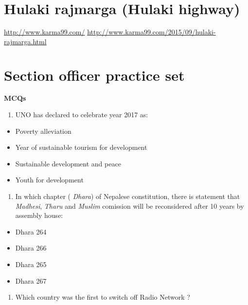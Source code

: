 \documentclass[]{book}
\providecommand{\tightlist}{%
  \setlength{\itemsep}{0pt}\setlength{\parskip}{0pt}}
\begin{document}
\hypertarget{hulaki-rajmarga-hulaki-highway}{%
\section{Hulaki rajmarga (Hulaki highway)}\label{hulaki-rajmarga-hulaki-highway}}

\url{http://www.karma99.com/}
\url{http://www.karma99.com/2015/09/hulaki-rajmarga.html}

\hypertarget{section-officer-practice-set}{%
\section{Section officer practice set}\label{section-officer-practice-set}}

\textbf{MCQs}

\begin{enumerate}
\def\labelenumi{\arabic{enumi}.}
\tightlist
\item
  UNO has declared to celebrate year 2017 as:
\end{enumerate}

\begin{itemize}
\tightlist
\item
  Poverty alleviation
\item
  Year of sustainable tourism for development
\item
  Sustainable development and peace
\item
  Youth for development
\end{itemize}

\begin{enumerate}
\def\labelenumi{\arabic{enumi}.}
\setcounter{enumi}{1}
\tightlist
\item
  In which chapter ( \emph{Dhara}) of Nepalese constitution, there is statement that \emph{Madhesi}, \emph{Tharu} and \emph{Muslim} comission will be reconsidered after 10 years by assembly house:
\end{enumerate}

\begin{itemize}
\tightlist
\item
  Dhara 264
\item
  Dhara 266
\item
  Dhara 265
\item
  Dhara 267
\end{itemize}

\begin{enumerate}
\def\labelenumi{\arabic{enumi}.}
\setcounter{enumi}{2}
\tightlist
\item
  Which country was the first to switch off Radio Network ?
\end{enumerate}
\end{document}
